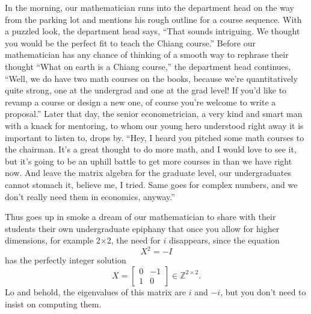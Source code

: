 \documentclass[graybox]{svmult}
\newcommand{\Z}{\mathds{Z}}
\begin{document}
In the morning, our mathematician runs into the department head on the way from the parking lot and mentions his rough outline for a course sequence. With a puzzled look, the department head says, ``That sounds intriguing. We thought you would be the perfect fit to teach the Chiang course.'' Before our mathematician has any chance of thinking of a smooth way to rephrase their thought ``What on earth is a Chiang course,'' the department head continues, ``Well, we do have two math courses on the books, because we're quantitatively quite strong, one at the undergrad and one at the grad level! If you'd like to revamp a course or design a new one, of course you're welcome to write a proposal.'' Later that day, the senior econometrician, a very kind and smart man with a knack for mentoring, to whom our young hero understood right away it is important to listen to, drops by. ``Hey, I heard you pitched some math courses to the chairman. It's a great thought to do more math, and I would love to see it, but it's going to be an uphill battle to get more courses in than we have right now. And leave the matrix algebra for the graduate level, our undergraduates cannot stomach it, believe me, I tried. Same goes for complex numbers, and we don't really need them in economics, anyway.'' \nocite{Chiang1984}

Thus goes up in smoke a dream of our mathematician to share with their students their own undergraduate epiphany that once you allow for higher dimensions, for example 2$\times$2, the need for $i$ disappears, since the equation
\[
X^2 = -I
\]
has the perfectly integer solution
\[
X = \left[\begin{array}{cc}
0 & -1 \\ 1 & 0
\end{array}\right]\in\Z^{2\times 2}.
\]
Lo and behold, the eigenvalues of this matrix are $i$ and $-i$, but you don't need to insist on computing them. 
\end{document}
